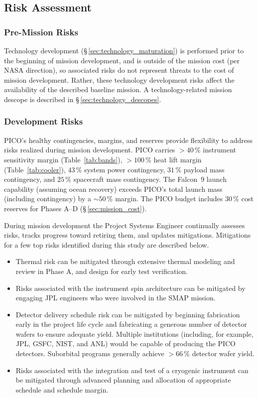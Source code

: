 \subsection{Risk Assessment}
\label{sec:risk_assessment} %

\subsubsection{Pre-Mission Risks}
\label{sec:premission_risks} %

Technology development (\S\,\ref{sec:technology_maturation}) is
performed prior to the beginning of mission development, and is
outside of the mission cost (per NASA direction), so associated risks
do not represent threats to the cost of mission development. Rather,
these technology development risks affect
the availability of the described baseline
mission. A technology-related mission descope is described in
\S\,\ref{sec:technology_descopes}.

\subsubsection{Development Risks}
\label{sec:development_risks} %

PICO's healthy contingencies, margins, and reserves provide
flexibility to address risks realized during mission development. PICO
carries $>40\,\%$ instrument sensitivity margin (Table~\ref{tab:bands}),
$>100\,\%$ heat lift margin (Table~\ref{tab:cooler}), $43\,\%$ system
power contingency, $31\,\%$ payload mass contingency, and $25\,\%$
spacecraft mass contingency. The Falcon~9 launch capability (assuming ocean
recovery) exceeds PICO's total launch mass (including contingency) by
a $\sim 50\,\%$ margin. The PICO budget includes $30\,\%$ cost
reserves for Phases A--D (\S\,\ref{sec:mission_cost}).

During mission development the Project Systems Engineer continually
assesses risks, tracks progress toward retiring them, and updates
mitigations. Mitigations for a few top risks identified during this
study are described below.
\begin{itemize}
\item Thermal risk can be mitigated through extensive thermal modeling and
review in Phase A, and design for early test verification.
\item Risks
associated with the instrument spin architecture can be mitigated by
engaging JPL engineers who were involved in the SMAP mission.
\item  Detector
delivery schedule risk can be mitigated by beginning fabrication early
in the project life cycle and fabricating a generous number of
detector wafers to ensure adequate yield. Multiple institutions (including, for example, JPL, GSFC, NIST, and ANL) would be capable of producing the PICO detectors. Suborbital programs generally achieve $>66\,\%$ detector wafer yield.
\item Risks associated with the
integration and test of a cryogenic instrument can be mitigated
through advanced planning and allocation of appropriate schedule and
schedule margin.
\end{itemize}

